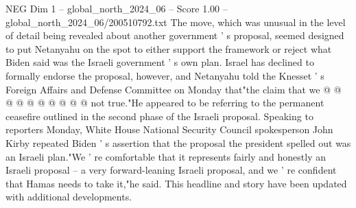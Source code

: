 \begin{textsample}{NEG Dim 1 – global\_north\_2024\_06 – Score 1.00 – global\_north\_2024\_06/200510792.txt}
The move, which was unusual in the level of detail being revealed about another government ' s proposal, seemed designed to put Netanyahu on the spot to either support the framework or reject what Biden said was the Israeli government ' s own plan.
Israel has declined to formally endorse the proposal, however, and Netanyahu told the Knesset ' s Foreign Affairs and Defense Committee on Monday that"the claim that we @ @ @ @ @ @ @ @ @ @ not true."He appeared to be referring to the permanent ceasefire outlined in the second phase of the Israeli proposal.
Speaking to reporters Monday, White House National Security Council spokesperson John Kirby repeated Biden ' s assertion that the proposal the president spelled out was an Israeli plan."We ' re comfortable that it represents fairly and honestly an Israeli proposal -- a very forward-leaning Israeli proposal, and we ' re confident that Hamas needs to take it,"he said.
This headline and story have been updated with additional developments.

\end{textsample}
